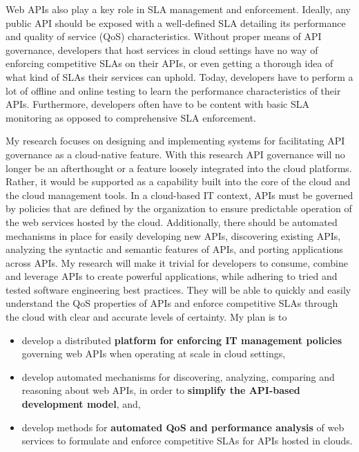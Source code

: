 Web APIs also play a key role in SLA
management and enforcement. Ideally, any public API should be exposed with a well-defined
SLA detailing its performance and quality of service (QoS) characteristics. Without proper means
of API governance, developers that host services in cloud settings have no way of enforcing
competitive SLAs on their APIs, or even getting a thorough idea of what kind of SLAs
their services can uphold. Today, developers have to perform a lot of offline
and online testing to learn the performance characteristics of their APIs.
Furthermore, developers often have to be content with basic SLA monitoring 
as opposed to comprehensive SLA enforcement. 

My research focuses on designing and implementing systems for facilitating 
API governance as a cloud-native feature. With this research API
governance will no longer be an afterthought or a feature loosely integrated
into the cloud platforms. Rather, it would be supported as a capability built into
the core of the cloud and the cloud management tools. 
In a cloud-based IT context, APIs must be governed by
policies that are defined by the organization to ensure predictable
operation of the web services hosted by the cloud. Additionally,
there should be automated mechanisms in place for easily developing new
APIs, discovering existing APIs, analyzing the syntactic and semantic features
of APIs, and porting applications across APIs. My research will make 
it trivial for developers to consume, combine and leverage APIs to create powerful
applications, while adhering to tried and tested software engineering 
best practices. They will be able to quickly and easily understand
the QoS properties of APIs and enforce competitive SLAs through the cloud
with clear and accurate levels of certainty. My plan is to
\begin{itemize}
\item develop a distributed {\bf platform for enforcing IT 
management policies} governing
web APIs when operating at scale in cloud settings,
\item develop automated mechanisms for discovering, analyzing, comparing and reasoning
about web APIs, in order to {\bf simplify the API-based development model}, and,
\item develop methods for {\bf automated QoS and performance analysis} of web services
to formulate and enforce competitive SLAs for APIs hosted in clouds.
\end{itemize}


